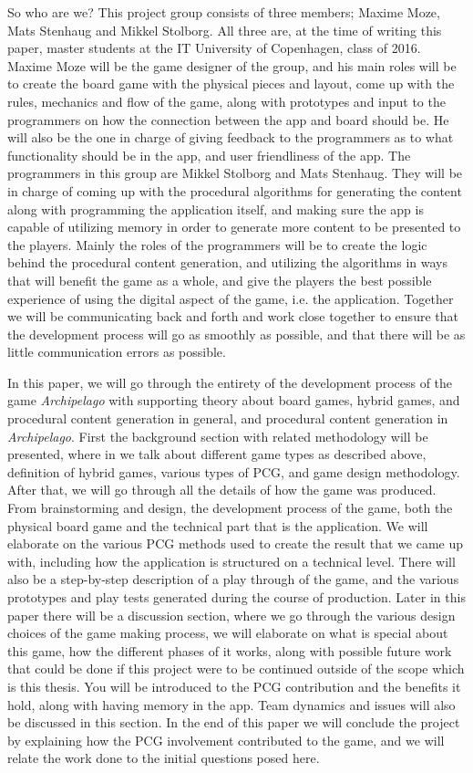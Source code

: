 So who are we? This project group consists of three members; Maxime Moze, Mats Stenhaug and Mikkel Stolborg. All three are, at the time of writing this paper, master students at the IT University of Copenhagen, class of 2016. Maxime Moze will be the game designer of the group, and his main roles will be to create the board game with the physical pieces and layout, come up with the rules, mechanics and flow of the game, along with prototypes and input to the programmers on how the connection between the app and board should be. He will also be the one in charge of giving feedback to the programmers as to what functionality should be in the app, and user friendliness of the app.
The programmers in this group are Mikkel Stolborg and Mats Stenhaug. They will be in charge of coming up with the procedural algorithms for generating the content along with programming the application itself, and making sure the app is capable of utilizing memory in order to generate more content to be presented to the players. Mainly the roles of the programmers will be to create the logic behind the procedural content generation, and utilizing the algorithms in ways that will benefit the game as a whole, and give the players the best possible experience of using the digital aspect of the game, i.e. the application.
Together we will be communicating back and forth and work close together to ensure that the development process will go as smoothly as possible, and that there will be as little communication errors as possible.


In this paper, we will go through the entirety of the development process of the game \textit{Archipelago} with supporting theory about board games, hybrid games, and procedural content generation in general, and procedural content generation in \textit{Archipelago}. First the background section with related methodology will be presented, where in we talk about different game types as described above, definition of hybrid games, various types of PCG, and game design methodology.
After that, we will go through all the details of how the game was produced. From brainstorming and design, the development process of the game, both the physical board game and the technical part that is the application. We will elaborate on the various PCG methods used to create the result that we came up with, including how the application is structured on a technical level. There will also be a step-by-step description of a play through of the game, and the various prototypes and play tests generated during the course of production.
Later in this paper there will be a discussion section, where we go through the various design choices of the game making process, we will elaborate on what is special about this game, how the different phases of it works, along with possible future work that could be done if this project were to be continued outside of the scope which is this thesis. You will be introduced to the PCG contribution and the benefits it hold, along with having memory in the app. Team dynamics and issues will also be discussed in this section.
In the end of this paper we will conclude the project by explaining how the PCG involvement contributed to the game, and we will relate the work done to the initial questions posed here.
